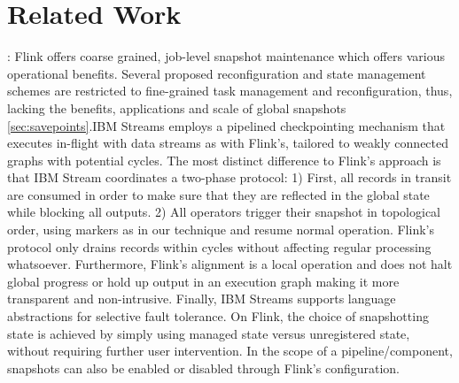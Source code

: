 
\section{Related Work}
\label{sec:related}
: Flink offers coarse grained, job-level snapshot maintenance which offers various operational benefits. Several proposed reconfiguration and state management schemes \cite{castro2013integrating} are restricted to fine-grained task management and reconfiguration, thus, lacking the benefits, applications and scale of global snapshots \autoref{sec:savepoints}.IBM Streams employs a pipelined checkpointing mechanism \cite{jacques2016consistent} that executes in-flight with data streams as with Flink's, tailored to weakly connected graphs with potential cycles. The most distinct difference to Flink's approach is that IBM Stream coordinates a two-phase protocol: 1) First, all records in transit are consumed in order to make sure that they are reflected in the global state while blocking all outputs. 2) All operators trigger their snapshot in topological order, using markers as in our technique and resume normal operation. Flink's protocol only drains records within cycles without affecting regular processing whatsoever. Furthermore, Flink's alignment is a local operation and does not halt global progress or hold up output in an execution graph making it more transparent and non-intrusive. Finally, IBM Streams supports language abstractions for selective fault tolerance. On Flink, the choice of snapshotting state is achieved by simply using managed state versus unregistered state, without requiring further user intervention. In the scope of a pipeline/component, snapshots can also be enabled or disabled through Flink's configuration. 

